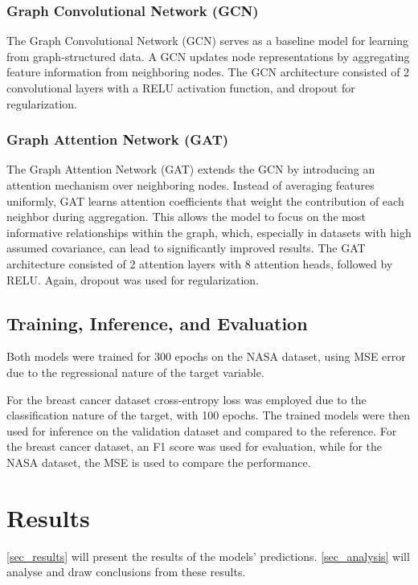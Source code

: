 \documentclass[12pt]{article}
\begin{document}
\subsubsection{Graph Convolutional Network (GCN)}
The Graph Convolutional Network (GCN) serves as a baseline model for learning from graph-structured data. A GCN updates node representations by aggregating feature information from neighboring nodes.
The GCN architecture consisted of 2 convolutional layers with a  RELU activation function, and dropout for regularization.

\subsubsection{Graph Attention Network (GAT)}
The Graph Attention Network (GAT) extends the GCN by introducing an attention mechanism over neighboring nodes. Instead of averaging features uniformly, GAT learns attention coefficients that weight the contribution of each neighbor during aggregation. This allows the model to focus on the most informative relationships within the graph, which, especially in datasets with high assumed covariance, can lead to significantly improved results.
The GAT architecture consisted of 2 attention layers with 8 attention heads, followed by RELU. Again, dropout was used for regularization.

\subsection{Training, Inference, and Evaluation}
Both models were trained for 300 epochs on the NASA dataset, using MSE error due to the regressional nature of the target variable.

For the breast cancer dataset cross-entropy loss was employed due to the classification nature of the target, with 100 epochs.
The trained models were then used for inference on the validation dataset and compared to the reference. For the breast cancer dataset, an F1 score was used for evaluation, while for the NASA dataset, the MSE is used to compare the performance.
\pagebreak

\section{Results} \label{sec_results}
\autoref{sec_results} will present the results of the models' predictions. \autoref{sec_analysis} will analyse and draw conclusions from these results.
\end{document}

